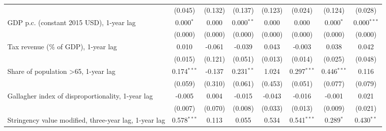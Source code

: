 \begin{table}[htbp]
\begin{tabular}{lccccccc}
                                                                                                  & (0.045)       & (0.132)                   & (0.137)        & (0.123)          & (0.024)         & (0.124)         & (0.028)\\   
      GDP p.c. (constant 2015 USD), 1-year lag                                                    & 0.000$^{*}$   & 0.000                     & 0.000$^{**}$   & 0.000            & 0.000           & 0.000$^{*}$     & 0.000$^{***}$\\   
                                                                                                  & (0.000)       & (0.000)                   & (0.000)        & (0.000)          & (0.000)         & (0.000)         & (0.000)\\   
      Tax revenue (\% of GDP), 1-year lag                                                         & 0.010         & -0.061                    & -0.039         & 0.043            & -0.003          & 0.038           & 0.042\\   
                                                                                                  & (0.015)       & (0.121)                   & (0.051)        & (0.013)          & (0.014)         & (0.025)         & (0.048)\\   
      Share of population >65, 1-year lag                                                         & 0.174$^{***}$ & -0.137                    & 0.231$^{**}$   & 1.024            & 0.297$^{***}$   & 0.446$^{***}$   & 0.116\\   
                                                                                                  & (0.059)       & (0.310)                   & (0.061)        & (0.453)          & (0.051)         & (0.077)         & (0.079)\\   
      Gallagher index of disproportionality, 1-year lag                                           & -0.005        & 0.004                     & -0.015         & -0.043           & -0.016          & -0.001          & 0.021\\   
                                                                                                  & (0.007)       & (0.070)                   & (0.008)        & (0.033)          & (0.013)         & (0.009)         & (0.021)\\   
      Stringency value modified, three-year lag, 1-year lag                                       & 0.578$^{***}$ & 0.113                     & 0.055          & 0.534            & 0.541$^{***}$   & 0.289$^{*}$     & 0.430$^{**}$\\   

\end{tabular}
\end{table}
